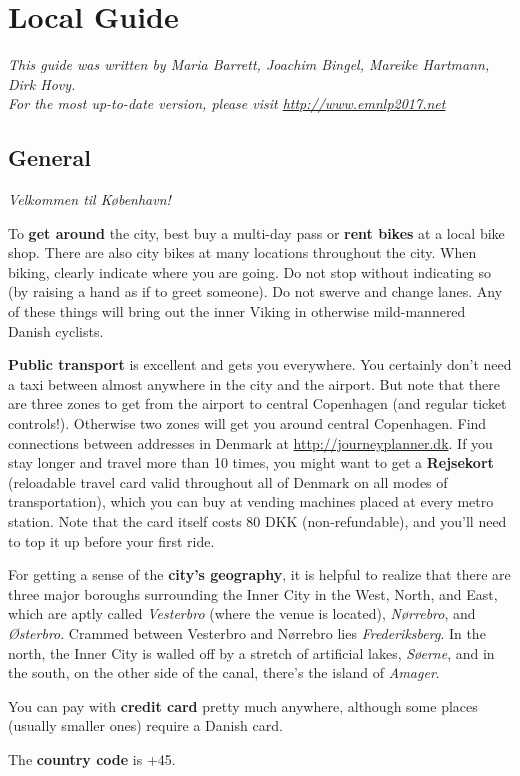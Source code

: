 

\chapter{Local Guide}


\emph{This guide was written by Maria Barrett, Joachim Bingel, Mareike Hartmann, Dirk Hovy.\\
\noindent For the most up-to-date version, please visit
  \url{http://www.emnlp2017.net}}
  



\section{General}
\textit{Velkommen til København!}

To \textbf{get around} the city, best buy a multi-day pass or \textbf{rent bikes} at a local bike shop. There are also city bikes at many locations throughout the city. When biking, clearly indicate where you are going. Do not stop without indicating so (by raising a hand as if to greet someone). Do not swerve and change lanes. Any of these things will bring out the inner Viking in otherwise mild-mannered Danish cyclists.

\textbf{Public transport} is excellent and gets you everywhere. You certainly don't need a taxi between almost anywhere in the city and the airport. But note that there are three zones to get from the airport to central Copenhagen (and regular ticket controls!). Otherwise two zones will get you around central Copenhagen. Find connections between addresses in Denmark at \url{http://journeyplanner.dk}. If you stay longer and travel more than 10 times, you might want to get a \textbf{Rejsekort} (reloadable travel card valid throughout all of Denmark on all modes of transportation), which you can buy at vending machines placed at every metro station. Note that the card itself costs 80 DKK (non-refundable), and you’ll need to top it up before your first ride.
\par
For getting a sense of the \textbf{city’s geography}, it is helpful to realize that there are three major boroughs surrounding the Inner City in the West, North, and East, which are aptly called \textit{Vesterbro} (where the venue is located), \textit{Nørrebro}, and \textit{Østerbro}. Crammed between Vesterbro and Nørrebro lies \textit{Frederiksberg}. In the north, the Inner City is walled off by a stretch of artificial lakes, \textit{Søerne}, and in the south, on the other side of the canal, there’s the island of \textit{Amager}. 
\par
You can pay with \textbf{credit card} pretty much anywhere, although some places (usually smaller ones) require a Danish card.
\par
The \textbf{country code} is +45.


